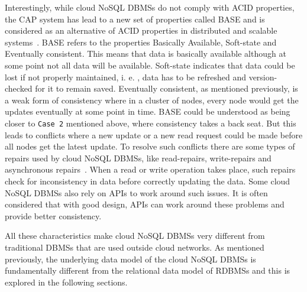 Interestingly,   while cloud \ac{NoSQL} \acp{DBMS} do not comply with ACID
properties,   the CAP system has lead to a new set of properties called BASE and
is considered as an alternative of ACID properties in distributed and scalable
systems~\citep{Pritchett}.
BASE refers to the properties Basically Available,   Soft-state and Eventually
consistent.  This means that data is basically available although at some point
not all data will be available.  Soft-state indicates that data could be lost if
not properly maintained,   i. e. ,   data has to be refreshed and
version-checked for it to remain saved.  Eventually consistent,   as mentioned
previously,   is a weak form of consistency where in a cluster of nodes,   every
node would get the updates eventually at some point in time.
BASE could be understood as being closer to  \texttt{Case 2} mentioned above,
where consistency takes a back seat.  But this leads to conflicts where a new
update or a new read request could be made before all nodes get the latest
update.  To resolve such conflicts there are some types of repairs used by cloud
\ac{NoSQL} \acp{DBMS}, like read-repairs,   write-repairs and asynchronous
repairs~\citep{Terry}. When a read or write operation takes place,   such
repairs check for inconsistency in data before correctly updating the data. 
Some cloud \ac{NoSQL} \acp{DBMS} also rely on APIs to work around such issues. 
It is often considered that with good design,   \acp{API} can work around these
problems and provide better consistency.

All these characteristics make cloud \ac{NoSQL} \acp{DBMS} very different from
traditional \acp{DBMS} that are used outside cloud networks.  As mentioned
previously, the underlying data model of the cloud \ac{NoSQL} \acp{DBMS} is
fundamentally different from the relational data model of \acp{RDBMS} and this
is explored in the following sections.
